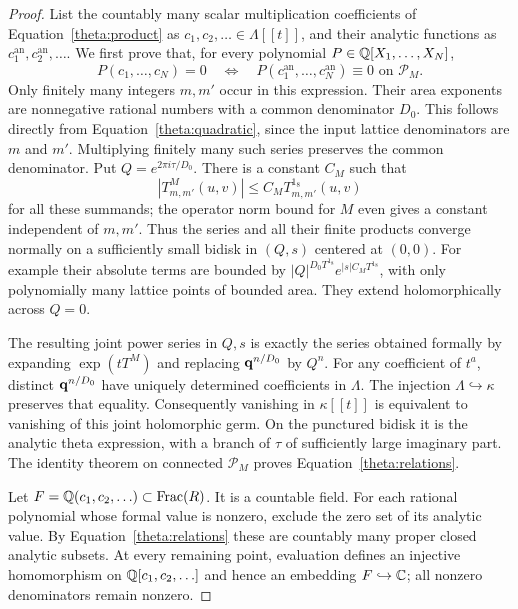 \begin{proof}
List the countably many scalar multiplication coefficients of
Equation~\eqref{theta:product} as $c_1,c_2,\ldots\in\Lambda[[t]]$,
and their analytic functions as $c_1^{\mathrm{an}},c_2^{\mathrm{an}},\ldots$.
We first prove that, for every polynomial $P\in\mathbb Q[X_1,\ldots,X_N]$,
\begin{equation}\label{theta:relations}
 P(c_1,\ldots,c_N)=0
 \quad\Longleftrightarrow\quad
 P(c_1^{\mathrm{an}},\ldots,c_N^{\mathrm{an}})\equiv0
       \text{ on }\mathcal P_M.
\end{equation}
Only finitely many integers $m,m'$ occur in this expression.
Their area exponents are nonnegative rational numbers with a common
denominator $D_0$.  This follows directly from
Equation~\eqref{theta:quadratic}, since the input lattice denominators
are $m$ and $m'$.  Multiplying finitely many such series preserves the
common denominator.  Put $Q=e^{2\pi i\tau/D_0}$.  There is a constant
$C_M$ such that
\[
 |T^M_{m,m'}(u,v)|\leq C_M T^{1_8}_{m,m'}(u,v)
\]
for all these summands; the operator norm bound for $M$ even gives a
constant independent of $m,m'$.  Thus the series and all their finite
products converge normally on a sufficiently small bidisk in $(Q,s)$
centered at $(0,0)$.  For example their absolute terms are bounded by
$|Q|^{D_0T^{1_8}}e^{|s|C_MT^{1_8}}$, with only polynomially many lattice
points of bounded area.  They extend holomorphically across $Q=0$.

The resulting joint power series in $Q,s$ is exactly the series obtained
formally by expanding $\exp(tT^M)$ and replacing
$\mathbf q^{n/D_0}$ by $Q^n$.  For any coefficient of $t^a$, distinct
$\mathbf q^{n/D_0}$ have uniquely determined coefficients in $\Lambda$.
The injection $\Lambda\hookrightarrow\kappa$ preserves that equality.
Consequently vanishing in $\kappa[[t]]$ is equivalent to vanishing of
this joint holomorphic germ.  On the punctured bidisk it is the analytic
theta expression, with a branch of $\tau$ of sufficiently large imaginary
part.  The identity theorem on connected $\mathcal P_M$ proves
Equation~\eqref{theta:relations}.

Let $F=\mathbb Q(c_1,c_2,\ldots)\subset\operatorname{Frac}(R)$.  It is a
countable field.  For each rational polynomial whose formal value is
nonzero, exclude the zero set of its analytic value.  By
Equation~\eqref{theta:relations} these are countably many proper closed
analytic subsets.  At every remaining point, evaluation defines an
injective homomorphism on $\mathbb Q[c_1,c_2,\ldots]$ and hence an embedding
$F\hookrightarrow\mathbb C$; all nonzero denominators remain nonzero.


\end{proof}
